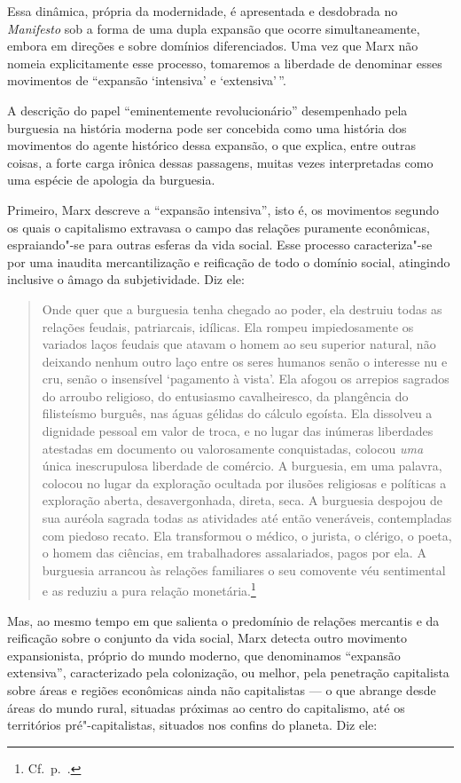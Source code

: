Essa dinâmica, própria da modernidade, é apresentada e desdobrada no
\textit{Manifesto} sob a forma de uma dupla expansão que ocorre
simultaneamente, embora em direções e sobre domínios diferenciados. Uma
vez que Marx não nomeia explicitamente esse processo, tomaremos a
liberdade de denominar esses movimentos de “expansão ‘intensiva’ e
‘extensiva’\,”.

A descrição do papel “eminentemente revolucionário” desempenhado pela
burguesia na história moderna pode ser concebida como uma história dos
movimentos do agente histórico dessa expansão, o que explica, entre
outras coisas, a forte carga irônica dessas passagens, muitas vezes
interpretadas como uma espécie de apologia da burguesia.

Primeiro, Marx descreve a ``expansão intensiva'', isto é, os movimentos
segundo os quais o capitalismo extravasa o campo das relações puramente
econômicas, espraiando"-se para outras esferas da vida social. Esse
processo caracteriza"-se por uma inaudita mercantilização e reificação
de todo o domínio social, atingindo inclusive o âmago da subjetividade.
Diz ele: 

\begin{quote} 
Onde quer que a burguesia tenha chegado ao poder, ela destruiu todas as
relações feudais, patriarcais, idílicas. Ela rompeu impiedosamente os
variados laços feudais que atavam o homem ao seu superior natural,
não deixando nenhum outro laço entre os seres humanos senão o interesse
nu e cru, senão o insensível ‘pagamento à vista’. Ela afogou os
arrepios sagrados do arroubo religioso, do entusiasmo cavalheiresco, da
plangência do filisteísmo burguês, nas águas gélidas do cálculo
egoísta. Ela dissolveu a dignidade pessoal em valor de troca, e no
lugar das inúmeras liberdades atestadas em documento ou valorosamente
conquistadas, colocou \textit{uma} única inescrupulosa liberdade de
comércio. A burguesia, em uma palavra, colocou no lugar da exploração
ocultada por ilusões religiosas e políticas a exploração aberta,
desavergonhada, direta, seca. A burguesia despojou de sua auréola
sagrada todas as atividades até então veneráveis, contempladas com
piedoso recato. Ela transformou o médico, o jurista, o clérigo, o
poeta, o homem das ciências, em trabalhadores assalariados, pagos por ela.
A burguesia arrancou às relações familiares o seu comovente véu
sentimental e as reduziu a pura relação monetária.\footnote{ Cf.~p.~\pageref{3}.}
\end{quote} 

Mas, ao mesmo tempo em que salienta o predomínio de relações mercantis e
da reificação sobre o conjunto da vida social, Marx detecta outro
movimento expansionista, próprio do mundo moderno, que denominamos
“expansão extensiva”, caracterizado pela colonização, ou melhor, pela
penetração capitalista sobre áreas e regiões econômicas ainda não
capitalistas --- o que abrange desde áreas do mundo rural, situadas
próximas ao centro do capitalismo, até os territórios
pré"-capitalistas, situados nos confins do planeta. Diz ele:

